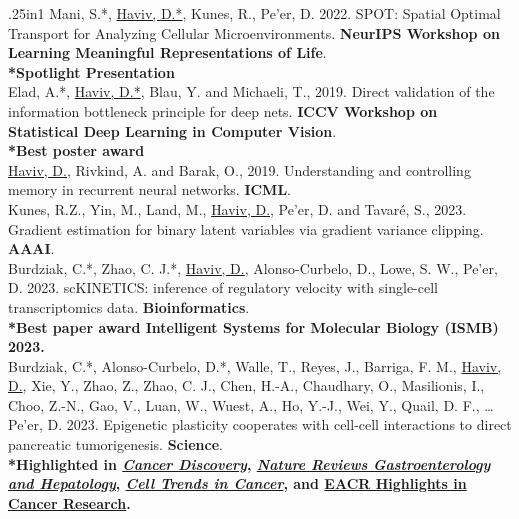 \documentclass[a4paper,9pt]{extarticle}
\begin{document}
\begin{hangparas}{.25in}{1}
{Mani, S.*, \underline{Haviv, D.*}, Kunes, R., Pe'er, D. 2022. SPOT: Spatial Optimal Transport for Analyzing Cellular Microenvironments. \textbf{NeurIPS Workshop on Learning Meaningful Representations of Life}.\\
\textbf{*Spotlight Presentation}\\

Elad, A.*, \underline{Haviv, D.*}, Blau, Y. and Michaeli, T., 2019. Direct validation of the information bottleneck principle for deep nets. \textbf{ICCV Workshop on Statistical Deep Learning in Computer Vision}.\\
\textbf{*Best poster award}\\

\underline{Haviv, D.}, Rivkind, A. and Barak, O., 2019. Understanding and controlling memory in recurrent neural networks. \textbf{ICML}.\\

Kunes, R.Z., Yin, M., Land, M., \underline{Haviv, D.}, Pe'er, D. and Tavaré, S., 2023. Gradient estimation for binary latent variables via gradient variance clipping. \textbf{AAAI}.\\

Burdziak, C.*, Zhao, C. J.*, \underline{Haviv, D.}, Alonso-Curbelo, D., Lowe, S. W.,  Pe’er, D. 2023. scKINETICS: inference of regulatory velocity with single-cell transcriptomics data. \textbf{Bioinformatics}.\\
\textbf{*Best paper award Intelligent Systems for Molecular Biology (ISMB) 2023.}\\

Burdziak, C.*, Alonso-Curbelo, D.*, Walle, T., Reyes, J., Barriga, F. M., \underline{Haviv, D.}, Xie, Y., Zhao, Z., Zhao, C. J., Chen, H.-A., Chaudhary, O., Masilionis, I., Choo, Z.-N., Gao, V., Luan, W., Wuest, A., Ho, Y.-J., Wei, Y., Quail, D. F., … Pe’er, D. 2023. Epigenetic plasticity cooperates with cell-cell interactions to direct pancreatic tumorigenesis. \textbf{Science}.\\
\textbf{*Highlighted in \href{https://aacrjournals.org/cancerdiscovery/article-abstract/13/7/1510/727607/Plasticity-Drives-Tumorigenic-Epithelial-Immune?redirectedFrom=fulltext}{\textit{Cancer Discovery}}, \href{https://www.nature.com/articles/s41575-023-00806-y}{\textit{Nature Reviews Gastroenterology and Hepatology}}, \href{https://www.cell.com/trends/cancer/fulltext/S2405-8033(23)00130-9?dgcid=raven_jbs_aip_email}{\textit{Cell Trends in Cancer}}, and \href{https://magazine.eacr.org/highlights-in-cancer-research-august-2023/}{EACR Highlights in Cancer Research}.}\\


}
\end{hangparas}
\end{document}
